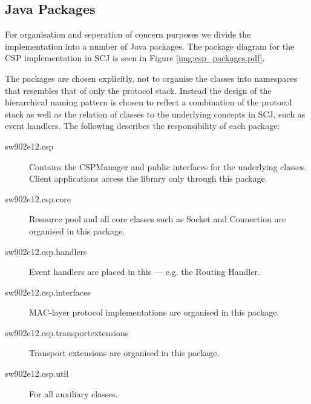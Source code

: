 \subsection{Java Packages}
For organisation and seperation of concern purposes we divide the implementation into a number of Java packages. The package diagram for the CSP implementation in SCJ is seen in Figure \ref{img:csp_packages.pdf}.

The packages are chosen explicitly, not to organise the classes into namespaces that resembles that of only the protocol stack. Instead the design of the hierarchical naming pattern is chosen to reflect a combination of the protocol stack as well as the relation of classes to the underlying concepts in SCJ, such as event handlers. The following describes the responsibility of each package:
\begin{description}
	\item[sw902e12.csp] Contains the CSPManager and public interfaces for the underlying classes. Client applications access the library only through this package.
	\item[sw902e12.csp.core] Resource pool and all core classes such as Socket and Connection are organised in this package.
	\item[sw902e12.csp.handlers] Event handlers are placed in this --- e.g. the Routing Handler.
	\item[sw902e12.csp.interfaces] MAC-layer protocol implementations are organised in this package.
	\item[sw902e12.csp.transportextensions] Transport extensions are organised in this package.
	\item[sw902e12.csp.util] For all auxiliary classes.
\end{description}